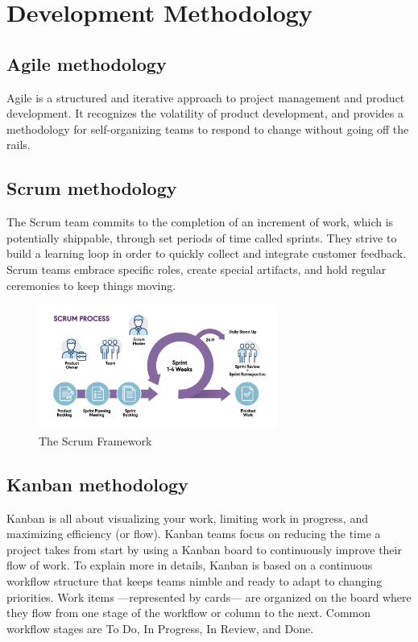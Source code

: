 \section{Development Methodology}
\subsection{Agile methodology}
Agile is a structured and iterative approach to project management and product development.
It recognizes the volatility of product development, and provides a methodology for self-organizing teams to respond to change without going off the rails.

\subsection{Scrum methodology}
The Scrum team commits to the completion of an increment of work, which is potentially shippable, through set periods of time called sprints.
They strive to build a learning loop in order to quickly collect and integrate customer feedback.
Scrum teams embrace specific roles, create special artifacts, and hold regular ceremonies to keep things moving.


\begin{figure}[H]
    \centering
    \includegraphics[width=0.7\textwidth]{src/assets/chapters/blog-scrum-process-opt.jpg}
    \caption{The Scrum Framework}
    \label{fig:Scrum_Framework_image}
\end{figure}


\subsection{Kanban methodology}
Kanban is all about visualizing your work, limiting work in progress, and maximizing efficiency (or flow).
Kanban teams focus on reducing the time a project takes from start by using a Kanban board to continuously improve their flow of work.
To explain more in details, Kanban is based on a continuous workflow structure that keeps teams nimble and ready to adapt to changing priorities.
Work items —represented by cards— are organized on the board where they flow from one stage of the workflow or column to the next.
Common workflow stages are To Do, In Progress, In Review, and Done.

